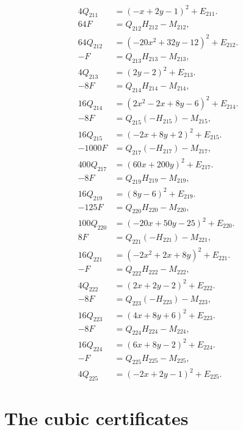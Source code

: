 \documentclass[11pt]{article}
\begin{document}
\begin{align}
4Q_{211}&=(-x+2y-1)^2+E_{211}.\label{eq:sign211b}\\
64F&=Q_{212}H_{212}-M_{212},\label{eq:sign212}\\
64Q_{212}&=(-20x^{2}+32y-12)^2+E_{212}.\label{eq:sign212b}\\
-F&=Q_{213}H_{213}-M_{213},\label{eq:sign213}\\
4Q_{213}&=(2y-2)^2+E_{213}.\label{eq:sign213b}\\
-8F&=Q_{214}H_{214}-M_{214},\label{eq:sign214}\\
16Q_{214}&=(2x^{2}-2x+8y-6)^2+E_{214}.\label{eq:sign214b}\\
-8F&=Q_{215}(-H_{215})-M_{215},\label{eq:sign215}\\
16Q_{215}&=(-2x+8y+2)^2+E_{215}.\label{eq:sign215b}\\
-1000F&=Q_{217}(-H_{217})-M_{217},\label{eq:sign217}\\
400Q_{217}&=(60x+200y)^2+E_{217}.\label{eq:sign217b}\\
-8F&=Q_{219}H_{219}-M_{219},\label{eq:sign219}\\
16Q_{219}&=(8y-6)^2+E_{219}.\label{eq:sign219b}\\
-125F&=Q_{220}H_{220}-M_{220},\label{eq:sign220}\\
100Q_{220}&=(-20x+50y-25)^2+E_{220}.\label{eq:sign220b}\\
8F&=Q_{221}(-H_{221})-M_{221},\label{eq:sign221}\\
16Q_{221}&=(-2x^{2}+2x+8y)^2+E_{221}.\label{eq:sign221b}\\
-F&=Q_{222}H_{222}-M_{222},\label{eq:sign222}\\
4Q_{222}&=(2x+2y-2)^2+E_{222}.\label{eq:sign222b}\\
-8F&=Q_{223}(-H_{223})-M_{223},\label{eq:sign223}\\
16Q_{223}&=(4x+8y+6)^2+E_{223}.\label{eq:sign223b}\\
-8F&=Q_{224}H_{224}-M_{224},\label{eq:sign224}\\
16Q_{224}&=(6x+8y-2)^2+E_{224}.\label{eq:sign224b}\\
-F&=Q_{225}H_{225}-M_{225},\label{eq:sign225}\\
4Q_{225}&=(-2x+2y-1)^2+E_{225}.\label{eq:sign225b}
\end{align}

\section{The cubic certificates}
\end{document}
